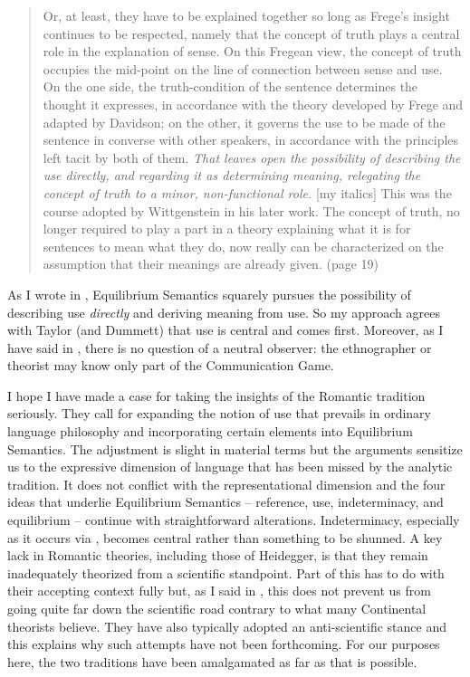 \begin{quote}

Or, at least, they have to be explained together so long as Frege's insight continues to be respected, namely that the concept of truth plays a central role in the explanation of sense. On this Fregean view, the concept of truth occupies the mid-point on the line of connection between sense and use. On the one side, the truth-condition of the sentence determines the thought it expresses, in accordance with the theory developed by Frege and adapted by Davidson; on the other, it governs the use to be made of the sentence in converse with other speakers, in accordance with the principles left tacit by both of them. \emph{That leaves open the possibility of describing the use directly, and regarding it as determining meaning, relegating the concept of truth to a minor, non-functional role.} [my italics] This was the course adopted by Wittgenstein in his later work. The concept of truth, no longer required to play a part in a theory explaining what it is for sentences to mean what they do, now really can be characterized on the assumption that their meanings are already given. (page 19)

\end{quote}

As I wrote in , Equilibrium Semantics squarely pursues the possibility of describing use \emph{directly} and deriving meaning from use. So my approach agrees with Taylor (and Dummett) that use is central and comes first. Moreover, as I have said in \citet[208]{parikh:le}, there is no question of a neutral observer: the ethnographer or theorist may know only part of the Communication Game.

I hope I have made a case for taking the insights of the Romantic tradition seriously. They call for expanding the notion of use that prevails in ordinary language philosophy and incorporating certain elements into Equilibrium Semantics. The adjustment is slight in material terms but the arguments sensitize us to the expressive dimension of language that has been missed by the analytic tradition. It does not conflict with the representational dimension and the four ideas that underlie Equilibrium Semantics -- reference, use, indeterminacy, and equilibrium -- continue with straightforward alterations. Indeterminacy, especially as it occurs via , becomes central rather than something to be shunned. A key lack in Romantic theories, including those of Heidegger, is that they remain inadequately theorized from a scientific standpoint. Part of this has to do with their accepting context fully but, as I said in , this does not prevent us from going quite far down the scientific road contrary to what many Continental theorists believe. They have also typically adopted an anti-scientific stance and this explains why such attempts have not been forthcoming. For our purposes here, the two traditions have been amalgamated as far as that is possible.

